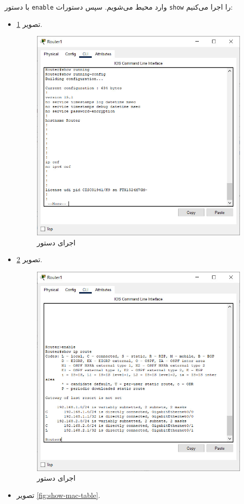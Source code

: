 \documentclass{article}
\newcommand{\code}[1]{\colorbox{codegray}{\texttt{#1}}}
\begin{document}
با دستور \code{enable} وارد محیط  می‌شویم. 
سپس دستورات \code{show} را اجرا می‌کنیم:
\begin{itemize}
	\item 
	\code{}
	تصویر \ref{fig:show-running-config}.
	\begin{figure}[h!]
		\centering
		\includegraphics[width=0.6\columnwidth]{figs/show-running-config.jpg}
		\caption{اجرای دستور \code{}}
		\label{fig:show-running-config}
	\end{figure}
	\item 
	\code{}
	تصویر \ref{fig:show-ip-route}.
	\begin{figure}[h!]
		\centering
		\includegraphics[width=0.6\columnwidth]{figs/show-ip-route.jpg}
		\caption{اجرای دستور \code{}}
		\label{fig:show-ip-route}
	\end{figure}
	\item 
	\code{}
	تصویر \ref{fig:show-mac-table}.
	\begin{figure}[h!]

\end{figure}
\end{itemize}
\end{document}

